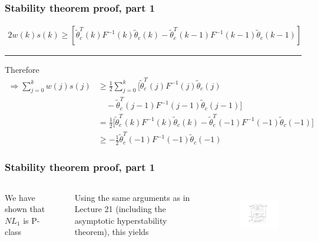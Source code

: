 \begin{frame}
    \frametitle{Stability theorem proof, part 1}

    \begin{align*}
         2 w(k) s(k) \geq \left[ \tilde{\theta}_c^T(k) F^{-1}(k) \tilde{\theta}_c(k)
            - \tilde{\theta}_c^T(k-1) F^{-1}(k-1) \tilde{\theta}_c(k-1) \right]
    \end{align*}
    \hrule{\hfill}
    
    Therefore
    \begin{align*}
        \Rightarrow \sum_{j=0}^k w(j) s(j) & \geq \frac{1}{2} \sum_{j=0}^k \Bigg[
            \tilde{\theta}_c^T(j) F^{-1}(j) \tilde{\theta}_c(j) \\
        & \quad - \tilde{\theta}_c^T(j-1) F^{-1}(j-1) \tilde{\theta}_c(j-1) \Bigg] \\
        & = \frac{1}{2} \Bigg[ \tilde{\theta}_c^T(k) F^{-1}(k) \tilde{\theta}_c(k)
            - \tilde{\theta}_c^T(-1) F^{-1}(-1) \tilde{\theta}_c(-1) \Bigg] \\
        & \geq - \frac{1}{2} \tilde{\theta}_c^T(-1) F^{-1}(-1) \tilde{\theta}_c(-1)
    \end{align*}
\end{frame}

\begin{frame}
    \frametitle{Stability theorem proof, part 1}

    \begin{columns}[c]
        We have shown that $NL_1$ is P-class

        $ \ $

        Using the same arguments as in Lecture 21 (including the asymptotic hyperstability theorem), this yields

        \begin{figure}[h]
            \centering
            \includegraphics[width=5cm]{figs_hyperstability}\\
        \end{figure}
    \end{columns}

\end{frame}

